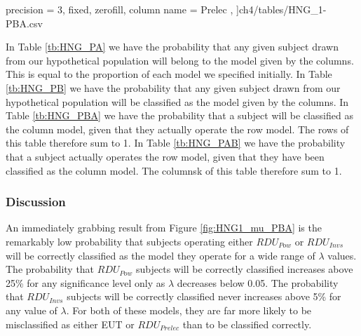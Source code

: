 \documentclass[../main.tex]{subfiles}
\begin{document}
{\begin{table}[ht!]
\begin{adjustbox}{}
{			precision = 3,
			fixed,
			zerofill,
			column name = {Prelec}
		},
	]{ch4/tables/HNG_1-PBA.csv} %
	\end{adjustbox}
\end{table}
\begin{table}[ht!]
	\centering
	\captionsetup{justification=centering}
	\caption{$P(A | B)$}
	\label{tb:HNG_PAB}
	\begin{adjustbox}{}
	\end{adjustbox}
\end{table}
}

\break

In Table \ref{tb:HNG_PA} we have the probability that any given subject drawn from our hypothetical population will belong to the model given by the columns.
This is equal to the proportion of each model we specified initially.
In Table \ref{tb:HNG_PB} we have the probability that any given subject drawn from our hypothetical population will be classified as the model given by the columns. 
In Table \ref{tb:HNG_PBA} we have the probability that a subject will be classified as the column model, given that they actually operate the row model.
The rows of this table therefore sum to 1.
In Table \ref{tb:HNG_PAB} we have the probability that a subject actually operates the row model, given that they have been classified as the column model.
The columnsk of this table therefore sum to 1.

\subsubsection{Discussion}

An immediately grabbing result from Figure \ref{fig:HNG1_mu_PBA} is the remarkably low probability that subjects operating either $\mathit{RDU_{Pow}}$ or $\mathit{RDU_{Invs}}$ will be correctly classified as the model they operate for a wide range of $\lambda$ values.
The probability that $\mathit{RDU_{Pow}}$ subjects will be correctly classified increases above 25\% for any significance level only as $\lambda$ decreases below 0.05.
The probability that $\mathit{RDU_{Invs}}$ subjects will be correctly classified never increases above 5\% for any value of $\lambda$.
For both of these models, they are far more likely to be misclassified as either EUT or $\mathit{RDU_{Prelec}}$ than to be classified correctly.
\end{document}
